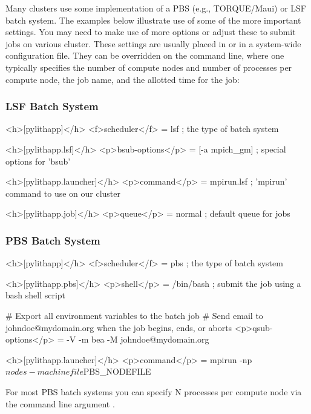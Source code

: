 Many clusters use some implementation of a PBS (e.g., TORQUE/Maui)
or LSF batch system. The examples below illustrate use of some of
the more important settings. You may need to make use of more options
or adjust these to submit jobs on various cluster. These settings
are usually placed in 
or in a system-wide configuration file. They can be overridden on
the command line, where one typically specifies the number of compute
nodes and number of processes per compute node, the job name, and
the allotted time for the job:


\subsubsection{LSF Batch System}
\begin{cfg}
<h>[pylithapp]</h>
<f>scheduler</f> = lsf    ; the type of batch system

<h>[pylithapp.lsf]</h>
<p>bsub-options</p> = [-a mpich_gm]    ; special options for 'bsub'

<h>[pylithapp.launcher]</h>
<p>command</p> = mpirun.lsf    ; 'mpirun' command to use on our cluster

<h>[pylithapp.job]</h>
<p>queue</p> = normal    ; default queue for jobs
\end{cfg}

\subsubsection{PBS Batch System}
\begin{cfg}
<h>[pylithapp]</h>
<f>scheduler</f> = pbs     ; the type of batch system

<h>[pylithapp.pbs]</h>
<p>shell</p> = /bin/bash     ; submit the job using a bash shell script

# Export all environment variables to the batch job
# Send email to johndoe@mydomain.org when the job begins, ends, or aborts
<p>qsub-options</p> = -V -m bea -M johndoe@mydomain.org

<h>[pylithapp.launcher]</h>
<p>command</p> = mpirun -np ${nodes} -machinefile ${PBS_NODEFILE}
\end{cfg}
For most PBS batch systems you can specify N processes per compute
node via the command line argument .

